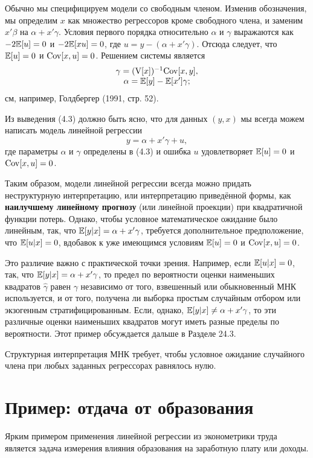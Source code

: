 Обычно мы специфицируем модели со свободным членом. Изменив обозначения, мы определим $x$ как  множество регрессоров кроме свободного члена, и заменим $x' \beta$ на $\alpha + x' \gamma$. Условия первого порядка относительно $\alpha$ и $\gamma$ выражаются как $-2\mathbb{E}{[u]}=0$ и $-2\mathbb{E}{[x u]}=0$, где $u = y - (\alpha + x' \gamma)$. Отсюда следует, что $\mathbb{E}{[u]}=0$ и $\mathrm{Cov}[x,u]=0$. Решением системы является
\begin{equation}
\begin{matrix}
\gamma = (\mathrm{V}[x])^{-1}\mathrm{Cov}[x,y], \\
\alpha = \mathbb{E}[y] - \mathbb{E}[x'] \gamma;
\end{matrix}
\end{equation} 
см, например, Голдбергер (1991, стр. 52).

Из выведения (4.3) должно быть ясно, что для данных $(y, x)$ мы всегда можем написать модель линейной регрессии 
\begin{equation}
 y = \alpha + x' \gamma + u ,
\end{equation}
где параметры  $\alpha$ и $\gamma$ определены в (4.3) и ошибка $u$ удовлетворяет  $\mathbb{E}[u]=0$ и $\mathrm{Cov}[x,u]=0$.

Таким образом, модели линейной регрессии всегда можно придать неструктурную интерпретацию, или интерпретацию приведённой формы, как \textbf{наилучшему линейному прогнозу} (или линейной проекции) при квадратичной функции потерь. Однако, чтобы условное математическое ожидание было линейным, так, что $\mathbb{E}{[y|x]} = \alpha + x' \gamma$, требуется дополнительное предположение, что $\mathbb{E}{[u|x]} = 0$, вдобавок к уже имеющимся условиям $\mathbb{E}{[u]}=0$ и $\mathrm{Cov}[x,u]=0$. 

Это различие важно с практической точки зрения. Например, если $\mathbb{E}{[u|x]} = 0$, так, что  $\mathbb{E}{[y|x]} = \alpha + x' \gamma$, то предел по вероятности оценки наименьших квадратов $\hat{\gamma}$  равен $\gamma$ независимо от того, взвешенный или обыкновенный МНК используется, и от того, получена ли выборка простым случайным отбором или экзогенным стратифицированным. Если, однако, $\mathbb{E}{[y|x]} \neq \alpha + x' \gamma$, то эти различные оценки наименьших квадратов могут иметь разные пределы по вероятности. Этот пример обсуждается дальше в Разделе 24.3.

Структурная интерпретация МНК требует, чтобы условное ожидание случайного члена при любых заданных регрессорах равнялось нулю.


\section{Пример: отдача от образования}
Ярким примером применения линейной регрессии из эконометрики труда является задача измерения влияния образования на заработную плату или доходы.

